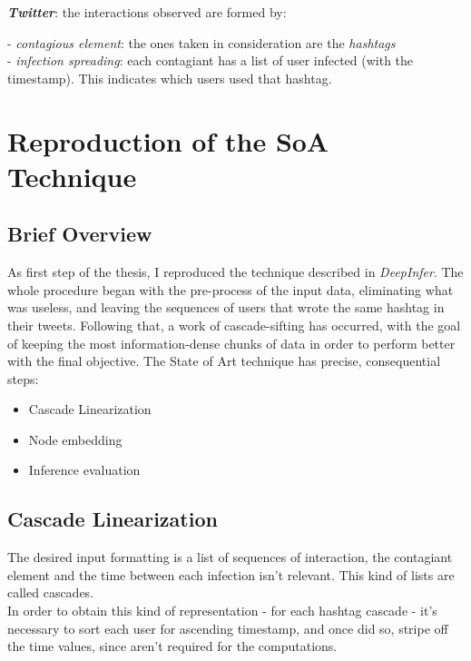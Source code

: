 \documentclass{article}
\begin{document}
		\begin{addmargin}[2em]{0em}
			\textbf{\textit{Twitter}}: the interactions observed are formed by:\\
				\begin{addmargin}[2em]{0em}
					- \textit{contagious element}: the ones taken in consideration are the \textit{hashtags} \\
					- \textit{infection spreading}: each contagiant has a list of user infected (with the timestamp). This indicates which users used that hashtag.
				\end{addmargin}
		\end{addmargin}
	
	\section{Reproduction of the SoA Technique}
		\subsection{Brief Overview}
			As first step of the thesis, I reproduced the technique described in \textit{DeepInfer}. The whole procedure began with the pre-process of the input data, eliminating what was useless, and leaving the sequences of users that wrote the same hashtag in their tweets. Following that, a work of cascade-sifting has occurred, with the goal of keeping the most information-dense chunks of data in order to perform better with the final objective.
			The State of Art technique has precise, consequential steps:
			\begin{itemize}
				\item Cascade Linearization
				\item Node embedding
				\item Inference evaluation
			\end{itemize}
		\subsection{Cascade Linearization}
			The desired input formatting is a list of sequences of interaction, the contagiant element and the time between each infection isn't relevant. This kind of lists are called cascades.\\
			In order to obtain this kind of representation - for each hashtag cascade - it's necessary to sort each user for ascending timestamp, and once did so, stripe off the time values, since aren't required for the computations.\\
\end{document}
